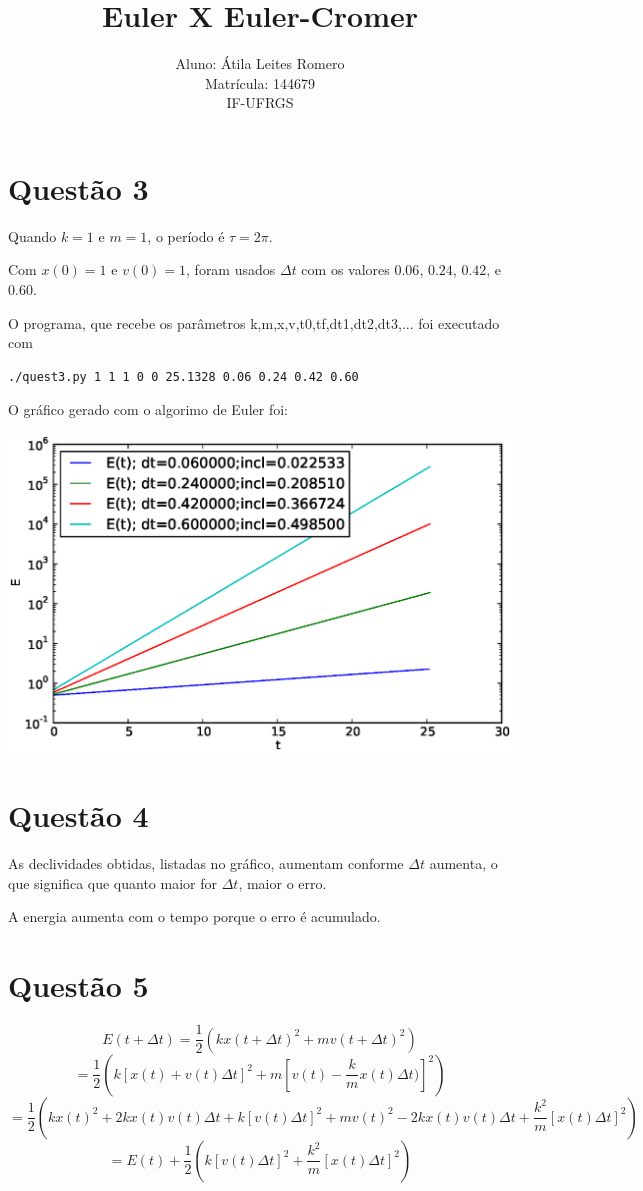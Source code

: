 \documentclass[brazilian,12pt,a4paper,final]{article}
\title{Euler X Euler-Cromer}
\author{Aluno: Átila Leites Romero \\ Matrícula: 144679 \\ IF-UFRGS}
\begin{document}
\maketitle

\section*{Questão 3} 
Quando $k=1$ e $m=1$, o período é $\tau=2\pi$. 

Com $x(0)=1$ e $v(0)=1$, foram usados $\Delta t$ com os valores 
$0.06$, $0.24$, $0.42$, e $0.60$.

O programa, que recebe os parâmetros k,m,x,v,t0,tf,dt1,dt2,dt3,...
foi executado com 
\begin{verbatim}
./quest3.py 1 1 1 0 0 25.1328 0.06 0.24 0.42 0.60
\end{verbatim}
O gráfico gerado com o algorimo de Euler foi:

\includegraphics[scale=0.75]{quest3.eps}

\section*{Questão 4} 
As declividades obtidas, listadas no gráfico,
aumentam conforme $\Delta t$ aumenta,
o que significa que quanto maior for $\Delta t$, maior o erro.

A energia aumenta com o tempo porque o erro é acumulado.

\section*{Questão 5} 
$$E(t+\Delta t)=\frac{1}{2}(kx(t+\Delta t)^2+mv(t+\Delta t)^2)$$
$$=\frac{1}{2}(k[x(t)+v(t)\Delta t]^2+m[v(t)-\frac{k}{m}x(t)\Delta t)]^2)$$
$$=\frac{1}{2}(kx(t)^2+2kx(t)v(t)\Delta t+k[v(t)\Delta t]^2+mv(t)^2-2kx(t)v(t)\Delta t+\frac{k^2}{m}[x(t)\Delta t]^2)$$
$$=E(t)+\frac{1}{2}(k[v(t)\Delta t]^2+\frac{k^2}{m}[x(t)\Delta t]^2)$$
\end{document}
